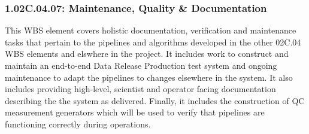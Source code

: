 \subsubsection{1.02C.04.07: Maintenance, Quality \& Documentation}

This WBS element covers holistic documentation, verification and
maintenance tasks that pertain to the pipelines and algorithms developed
in the other 02C.04 WBS elements and elswhere in the project. It
includes work to construct and maintain an end-to-end Data Release
Production test system and ongoing maintenance to adapt the pipelines to
changes elsewhere in the system. It also includes providing high-level,
scientist and operator facing documentation describing the the system as
delivered. Finally, it includes the construction of QC measurement generators
which will be used to verify that pipelines are functioning correctly during
operations.

